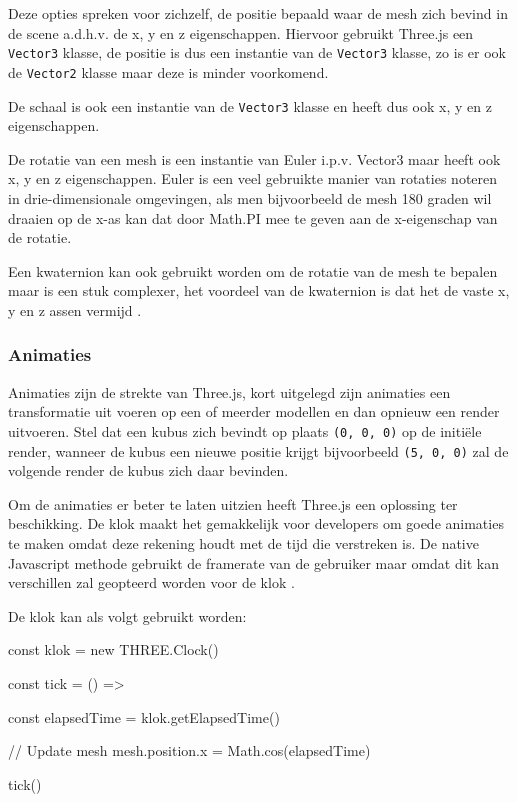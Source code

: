 Deze opties spreken voor zichzelf, de positie bepaald waar de mesh zich bevind in de scene a.d.h.v. de x, y en z eigenschappen. Hiervoor gebruikt Three.js een \texttt{Vector3} klasse, de positie is dus een instantie van de \texttt{Vector3} klasse, zo is er ook de \texttt{Vector2} klasse maar deze is minder voorkomend.

De schaal is ook een instantie van de \texttt{Vector3} klasse en heeft dus ook x, y en z eigenschappen.

De rotatie van een mesh is een instantie van Euler i.p.v. Vector3 maar heeft ook x, y en z eigenschappen. Euler is een veel gebruikte manier van rotaties noteren in drie-dimensionale omgevingen, als men bijvoorbeeld de mesh 180 graden wil draaien op de x-as kan dat door Math.PI mee te geven aan de x-eigenschap van de rotatie.

Een kwaternion kan ook gebruikt worden om de rotatie van de mesh te bepalen maar is een stuk complexer, het voordeel van de kwaternion is dat het de vaste x, y en z assen vermijd \autocite{Simon2023}.

\subsubsection{Animaties}

Animaties zijn de strekte van Three.js, kort uitgelegd zijn animaties een transformatie uit voeren op een of meerder modellen en dan opnieuw een render uitvoeren. Stel dat een kubus zich bevindt op plaats \texttt{(0, 0, 0)} op de initiële render, wanneer de kubus een nieuwe positie krijgt bijvoorbeeld \texttt{(5, 0, 0)} zal de volgende render de kubus zich daar bevinden. 

Om de animaties er beter te laten uitzien heeft Three.js een oplossing ter beschikking. De klok maakt het gemakkelijk voor developers om goede animaties te maken omdat deze rekening houdt met de tijd die verstreken is. De native Javascript methode gebruikt de framerate van de gebruiker maar omdat dit kan verschillen zal geopteerd worden voor de klok \autocite{Simon2023}.

De klok kan als volgt gebruikt worden:

\begin{LVerbatim}
const klok = new THREE.Clock()

const tick = () =>
{
	const elapsedTime = klok.getElapsedTime()
	
	// Update mesh
	mesh.position.x = Math.cos(elapsedTime)
}

tick()
\end{LVerbatim}

